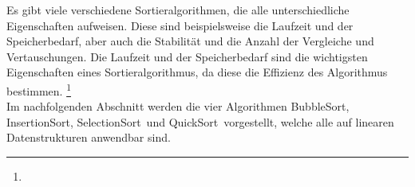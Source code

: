\documentclass[../entry.tex]{subfiles}
\begin{document}
    Es gibt viele verschiedene Sortieralgorithmen, die alle unterschiedliche Eigenschaften aufweisen.
    Diese sind beispielsweise die Laufzeit und der Speicherbedarf, aber auch die Stabilität
    und die Anzahl der Vergleiche und Vertauschungen.
    Die Laufzeit und der Speicherbedarf sind die wichtigsten Eigenschaften eines Sortieralgorithmus,
    da diese die Effizienz des Algorithmus bestimmen.
    \footnote{}\\

    Im nachfolgenden Abschnitt werden die vier Algorithmen \dq BubbleSort\dq, \dq InsertionSort\dq, \dq SelectionSort\dq\ und \dq QuickSort\dq\ vorgestellt,
    welche alle auf linearen Datenstrukturen anwendbar sind.
\end{document}
